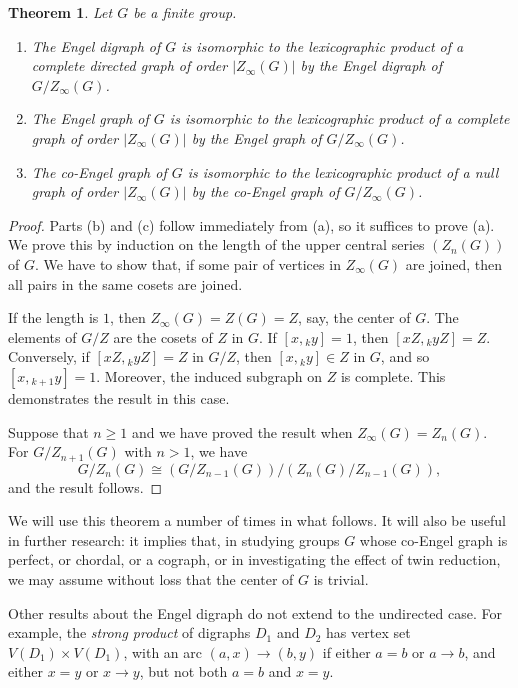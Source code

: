 \documentclass[reqno,12pt]{amsart}
\theoremstyle{plain}
\newtheorem{thm}{Theorem}[section]
\theoremstyle{definition}
\begin{document}
\begin{thm}
Let $G$ be a finite group.
\begin{enumerate}
\item The Engel digraph of $G$ is isomorphic to the lexicographic product of
a complete directed graph of order $|Z_\infty(G)|$ by the Engel digraph of
$G/Z_\infty(G)$.
\item The Engel graph of $G$ is isomorphic to the lexicographic product of
a complete graph of order $|Z_\infty(G)|$ by the Engel graph of
$G/Z_\infty(G)$.
\item The co-Engel graph of $G$ is isomorphic to the lexicographic product of
a null graph of order $|Z_\infty(G)|$ by the co-Engel graph of $G/Z_\infty(G)$.
\end{enumerate}
\end{thm}

\begin{proof}
Parts (b) and (c) follow immediately from (a), so it suffices to prove (a).
We prove this by induction on the length of the upper central series 
$(Z_n(G))$ of $G$. We have to show that, if some pair of vertices in
$Z_\infty(G)$ are joined, then all pairs in the same cosets are joined.

If the length is $1$, then $Z_\infty(G)=Z(G)=Z$, say, the center of $G$.
The elements of $G/Z$ are the cosets of $Z$ in $G$. If $[x,{}_ky]=1$, then
$[xZ,{}_kyZ]=Z$. Conversely, if $[xZ,{}_kyZ]=Z$ in $G/Z$, then $[x,{}_ky]\in Z$
in $G$, and so $[x,{}_{k+1}y]=1$. Moreover, the induced subgraph on $Z$ is
complete. This demonstrates the result in this case.

Suppose that $n\ge1$ and we have proved the result when $Z_\infty(G)=Z_n(G)$.
For $G/Z_{n+1}(G)$ with $n>1$, we have
\[G/Z_n(G)\cong(G/Z_{n-1}(G))/(Z_n(G)/Z_{n-1}(G)),\]
and the result follows.
\end{proof}

We will use this theorem a number of times in what follows. It will also be
useful in further research: it implies that, in studying groups $G$ whose
co-Engel graph is perfect, or chordal, or a cograph, or in investigating the
effect of twin reduction, we may assume without loss that the center of $G$
is trivial.

Other results about the Engel digraph do not extend to the undirected case.
For example, the \emph{strong product} of digraphs $D_1$ and $D_2$ has
vertex set $V(D_1)\times V(D_1)$, with an arc $(a,x)\to(b,y)$ if either
$a=b$ or $a\to b$, and either $x=y$ or $x\to y$, but not both $a=b$ and
$x=y$.
\end{document}
